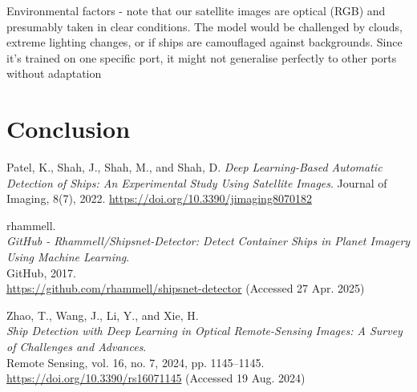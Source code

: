 \documentclass[11pt]{article}
\begin{document}
	Environmental factors - note that our satellite images are optical (RGB) and presumably taken in clear conditions. The model would be challenged by clouds, extreme lighting changes, or if ships are camouflaged against backgrounds. Since it's trained on one specific port, it might not generalise perfectly to other ports without adaptation
	
	\section*{Conclusion}
	
	\newpage
	\begin{flushleft}
		\begin{thebibliography}{9}
			Patel, K., Shah, J., Shah, M., and Shah, D.
			\textit{Deep Learning-Based Automatic Detection of Ships: An Experimental Study Using Satellite Images}.
			Journal of Imaging, 8(7), 2022.
			\url{https://doi.org/10.3390/jimaging8070182}
			
			rhammell.\\
			\textit{GitHub - Rhammell/Shipsnet-Detector: Detect Container Ships in Planet Imagery Using Machine Learning}.\\
			GitHub, 2017.\\
			\url{https://github.com/rhammell/shipsnet-detector} (Accessed 27 Apr. 2025)
			
			Zhao, T., Wang, J., Li, Y., and Xie, H.\\
			\textit{Ship Detection with Deep Learning in Optical Remote-Sensing Images: A Survey of Challenges and Advances}.\\
			Remote Sensing, vol. 16, no. 7, 2024, pp. 1145--1145.\\
			\url{https://doi.org/10.3390/rs16071145} (Accessed 19 Aug. 2024)
			
		\end{thebibliography}
	\end{flushleft}
\end{document}
